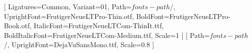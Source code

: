 
\usepackage{wrapfig}
\usepackage{array}
\usepackage{graphicx}
\usepackage{url}
\usepackage{units}
\usepackage{cleveref}

\usepackage{tabu}
\usepackage{float}
\usepackage[bf, position=top, justification=justified, singlelinecheck=false]{caption}
\renewcommand{\captionfont}{\small}%

\usepackage{morefloats}

\usepackage[small]{titlesec}

\usepackage{xparse}

\fi{} %
  \usepackage[sfdefault, light]{roboto}
  \usepackage{inconsolata}

  \usepackage{eurosym}

\else  %
  \makeatletter
  \makeatother
  \makeatletter
  \makeatother
  \newcommand{\euro}{€}

    \setmainfont{FrutigerNeueLT}[
      Ligatures={Common}, Variant=01,
      Path=$fonts-path$/,
      UprightFont=FrutigerNeueLTPro-Thin.otf,
      BoldFont=FrutigerNeueLTPro-Book.otf,
      ItalicFont=FrutigerNeueLTCom-ThinIt.ttf,
      BoldItalicFont=FrutigerNeueLTCom-Medium.ttf,
      Scale=1
    ]
    \setmonofont{DejaVuSansMono}[
      Path=$fonts-path$/,
      UprightFont=DejaVuSansMono.ttf,
      Scale=0.8
    ]
\fi

